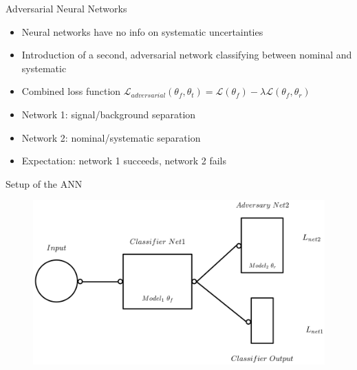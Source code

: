 \documentclass[10pt, UKenglish]{beamer}
\begin{document}
\begin{frame}{Adversarial Neural Networks}
    \begin{itemize}
        \item Neural networks have no info on systematic uncertainties 
        \vspace{0.2cm}
        \item Introduction of a second, adversarial network classifying between nominal and systematic
        \vspace{0.2cm}
        \item Combined loss function $\mathcal{L}_{adversarial}\left( \theta_f, \theta_t \right) = \mathcal{L}(\theta_f) - \lambda \mathcal{L}(\theta_f, \theta_r)$
        \vspace{0.2cm}
        \item Network 1: signal/background separation
        \vspace{0.2cm}
        \item Network 2: nominal/systematic separation
        \vspace{0.2cm}
        \item Expectation: network 1 succeeds, network 2 fails
    \end{itemize}
\end{frame}

\begin{frame}{Setup of the ANN}
    \begin{figure}
        \centering
        \includegraphics[width=\textwidth]{ANN_sketch.png}
        \label{fig:my_label}
    \end{figure}
\end{frame}
\end{document}
